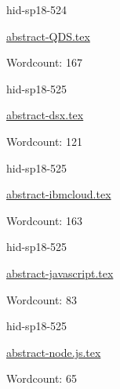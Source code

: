 

\begin{IU}

hid-sp18-524

\href{https://github.com/cloudmesh-community/hid-sp18-524/blob/master//technology/abstract-QDS.tex}{abstract-QDS.tex}

 

Wordcount: 167

\end{IU}



\begin{IU}

hid-sp18-525

\href{https://github.com/cloudmesh-community/hid-sp18-525/blob/master//technology/abstract-dsx.tex}{abstract-dsx.tex}

 

Wordcount: 121

\end{IU}



\begin{IU}

hid-sp18-525

\href{https://github.com/cloudmesh-community/hid-sp18-525/blob/master//technology/abstract-ibmcloud.tex}{abstract-ibmcloud.tex}

 

Wordcount: 163

\end{IU}



\begin{IU}

hid-sp18-525

\href{https://github.com/cloudmesh-community/hid-sp18-525/blob/master//technology/abstract-javascript.tex}{abstract-javascript.tex}

 

Wordcount: 83

\end{IU}



\begin{IU}

hid-sp18-525

\href{https://github.com/cloudmesh-community/hid-sp18-525/blob/master//technology/abstract-node.js.tex}{abstract-node.js.tex}

 

Wordcount: 65

\end{IU}

